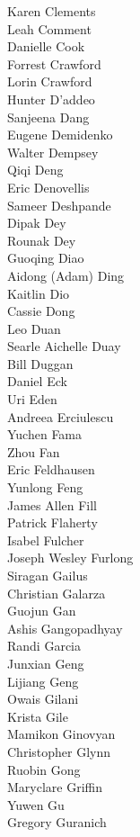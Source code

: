 Karen Clements\\
Leah Comment\\
Danielle Cook\\
Forrest Crawford\\
Lorin Crawford\\
Hunter D'addeo\\
Sanjeena Dang\\
Eugene Demidenko\\
Walter Dempsey\\
Qiqi Deng\\
Eric Denovellis\\
Sameer Deshpande\\
Dipak Dey\\
Rounak Dey\\
Guoqing Diao\\
Aidong (Adam) Ding\\
Kaitlin Dio\\
Cassie Dong\\
Leo Duan\\
Searle Aichelle Duay\\
Bill Duggan\\
Daniel Eck\\
Uri Eden\\
Andreea Erciulescu\\
Yuchen Fama\\
Zhou Fan\\
Eric Feldhausen\\
Yunlong Feng\\
James Allen Fill\\
Patrick Flaherty\\
Isabel Fulcher\\
Joseph Wesley Furlong\\
Siragan Gailus\\
Christian Galarza\\
Guojun Gan\\
Ashis Gangopadhyay\\
Randi Garcia\\
Junxian Geng\\
Lijiang Geng\\
Owais Gilani\\
Krista Gile\\
Mamikon Ginovyan\\
Christopher Glynn\\
Ruobin Gong\\
Maryclare Griffin\\
Yuwen Gu\\
Gregory Guranich\\
